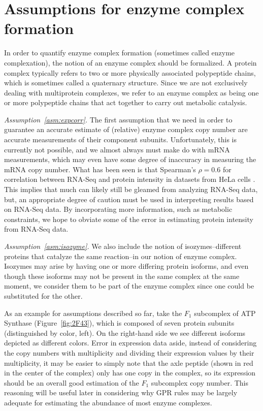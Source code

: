 \section{Assumptions for enzyme complex formation}
\label{sec:complexation}

In order to quantify enzyme complex formation (sometimes called enzyme
complexation), the notion of an enzyme complex should be formalized.
A protein complex typically refers to two or more physically
associated polypeptide chains, which is sometimes called a quaternary
structure. Since we are not exclusively dealing with multiprotein
complexes, we refer to an enzyme complex as being one or more
polypeptide chains that act together to carry out metabolic
catalysis.

\emph{Assumption~\ref{asm:expcorr}.}  The first assumption that we
need in order to guarantee an accurate estimate of (relative) enzyme
complex copy number are accurate measurements of their component
subunits. Unfortunately, this is currently not possible, and we almost
always must make do with mRNA measurements, which may even have some
degree of inaccuracy in measuring the mRNA copy number. What has been
seen is that Spearman's $\rho = 0.6$ for correlation between RNA-Seq
and protein intensity in datasets from HeLa cells
\citep{Nagaraj2011}. This implies that much can likely still be
gleamed from analyzing RNA-Seq data, but, an appropriate degree of
caution must be used in interpreting results based on RNA-Seq data. By
incorporating more information, such as metabolic constraints, we hope
to obviate some of the error in estimating protein intensity from
RNA-Seq data. 

\emph{Assumption~\ref{asm:isozyme}.} We also include the notion of
isozymes--different proteins that catalyze the same reaction--in our
notion of enzyme complex. Isozymes may arise by having one or more
differing protein isoforms, and even though these isoforms may not be
present in the same complex at the same moment, we consider them to be
part of the enzyme complex since one could be substituted for the
other.

As an example for assumptions described so far, take the $F_1$
subcomplex of ATP Synthase (Figure~\ref{fig:2F43}), which is composed
of seven protein subunits (distinguished by color, left). On the
right-hand side we see different isoforms depicted as different
colors.  Error in expression data aside, instead of considering the
copy numbers with multiplicity and dividing their expression values by
their multiplicity, it may be easier to simply note that the axle
peptide (shown in red in the center of the complex) only has one copy
in the complex, so its expression should be an overall good estimation
of the $F_1$ subcomplex copy number. This reasoning will be useful
later in considering why GPR rules may be largely adequate for estimating
the abundance of most enzyme complexes.

